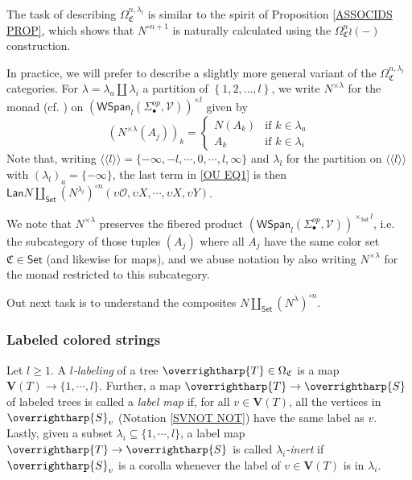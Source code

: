 \documentclass[a4paper,10pt
]{article}%
\numberwithin{equation}{section}
\numberwithin{figure}{section}
\theoremstyle{definition} %
\newcommand{\set}[1]{\left\{#1\right\}}%
\newcommand{\vect}[1]{\text{\overrightharp{\ensuremath{#1}}}}
\renewcommand{\O}{\ensuremath{\mathcal O}}
\newcommand{\1}{\ensuremath{\mathbbm 1}}%
\begin{document}
The task of describing 
$\Omega^{n,\lambda_l}_{\mathfrak{C}}$
is similar to the spirit of Proposition \ref{ASSOCIDS PROP}, which shows that
$N^{\circ n+1}$ is naturally calculated using the
$\Omega_{\mathfrak{C}}^{n} \wr (-)$ 
construction.

In practice, we will prefer to describe a slightly more general variant of the $\Omega^{n,\lambda_l}_{\mathfrak{C}}$ categories.
For $\lambda = \lambda_a \amalg \lambda_i$
a partition of $\set{1,2,\dots,l}$,
we write 
$N^{\times \lambda}$
for the monad (cf. \cite[\S 2.3]{BP21}) on 
$\left(\mathsf{WSpan}_l(\Sigma_{\bullet}^{op},\mathcal{V})\right)^{\times l}$
given by
\begin{equation}\label{NLAMBMON EQ}
\left(N^{\times \lambda} (A_j)\right)_k = 
\begin{cases}
N(A_k) & \text{if } k\in \lambda_a
\\
A_k & \text{if } k\in \lambda_i
\end{cases}
\end{equation}
Note that, writing 
$\langle\langle l\rangle\rangle = 
\{-\infty,-l,\cdots,0,\cdots,l,\infty\}$
and $\lambda_l$ for the partition on 
$\langle\langle l\rangle\rangle$ with
$\left(\lambda_l\right)_{a}=\{-\infty\}$,
the last term in \eqref{OU EQ1} is then
$\mathsf{Lan}N\coprod_{\mathsf{Set}}
\left(N^{\lambda_l}\right)^{\circ n}
(\upsilon\O,\upsilon X,\cdots,\upsilon X,\upsilon Y)$.

We note that $N^{\times \lambda}$
preserves the fibered product
$\left(\mathsf{WSpan}_l(\Sigma_{\bullet}^{op},\mathcal{V})\right)^{\times_{\mathsf{Set}} l}$,
i.e. the subcategory of those tuples $(A_j)$
where all $A_j$ have the same color set $\mathfrak{C} \in \mathsf{Set}$ (and likewise for maps), 
and we abuse notation by also writing 
$N^{\times \lambda}$
for the monad restricted to this subcategory.

Out next task is to understand the composites
$N\coprod_{\mathsf{Set}}
\left(N^{\lambda}\right)^{\circ n}$.

\subsubsection*{Labeled colored strings}
\label{LCS_SEC}

Let $l \geq 1$. A \emph{$l$-labeling} of a tree $\vect{T} \in \Omega_{\mathfrak{C}}$ is a map
$\boldsymbol{V}(T) \to \{1,\cdots,l\}$.
Further, a map 
$\vect{T} \to \vect{S}$ of labeled trees
is called a \emph{label map}
if, for all $v \in \boldsymbol{V}(T)$,
all the vertices in $\vect{S}_v$ (Notation \ref{SVNOT NOT})
have the same label as $v$.
Lastly, given a subset $\lambda_i \subseteq \{1,\cdots,l\}$,
a label map 
$\vect{T} \to \vect{S}$
is called \emph{$\lambda_i$-inert}
if $\vect{S}_v$ is a corolla whenever the label of
$v \in \boldsymbol{V}(T)$ is in $\lambda_i$.
\end{document}
